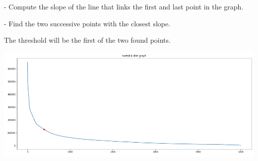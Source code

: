- Compute the slope of the line that links the first and last point in the graph.

- Find the two successive points with the closest slope.

The threshold will be the first of the two found points.

\begin{center}
\includegraphics[scale=0.4]{DBSCAN_epsilon_2.png}
\end{center}

\vspace{5mm}